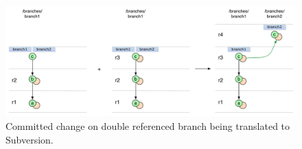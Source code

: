 \begin{enumerate}
\begin{figure}[h]
\centering
\includegraphics[width=\linewidth]{img/diagrams/ambiguous_svn_branch_git_to_svn.pdf}
\caption{Committed change on double referenced branch being translated to Subversion.}
\label{ambiguous_svn_branch_git_to_svn}
\end{figure}

\end{enumerate}
